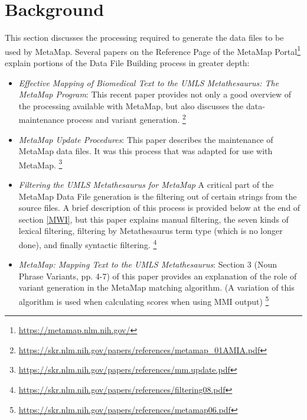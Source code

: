 \documentclass[letterpaper,article]{memoir}
\begin{document}

\chapter{Background}\label{Background}

This section discusses the processing required
to generate the data files to be used by MetaMap.
Several papers on the Reference Page of the
MetaMap Portal\footnote{\url{https://metamap.nlm.nih.gov/}}
explain portions of the Data File Building process
in greater depth:

\begin{itemize}
\item {\em Effective Mapping of Biomedical Text to the UMLS Metathesaurus:
	The MetaMap Program\/}:
  	This recent paper provides not only a good overview of the
	processing available with MetaMap,
        but also discusses the data-maintenance process and variant
        generation.
\footnote{\url{https://skr.nlm.nih.gov/papers/references/metamap_01AMIA.pdf}}
\item {\em MetaMap Update Procedures\/}:
	This paper describes the maintenance of MetaMap data files. It was
        this process that was adapted for use with MetaMap.
\footnote{\url{https://skr.nlm.nih.gov/papers/references/mm.update.pdf}}
\item {\em Filtering the UMLS Metathesaurus for MetaMap\/} 
	A critical part of the MetaMap Data File generation is the
        filtering out of certain strings from the source files.
	A brief description of this process
        is provided below at the end of section \ref{MWI},
        but this paper explains manual filtering,
        the seven kinds of lexical filtering,
        filtering by Metathesaurus term type (which is no longer done),
        and finally syntactic filtering.
\footnote{\url{https://skr.nlm.nih.gov/papers/references/filtering08.pdf}}
\item {\em MetaMap: Mapping Text to the UMLS Metathesaurus\/}:
	Section 3 (Noun Phrase Variants, pp. 4-7) of this paper
        provides an explanation of the role of variant generation
        in the MetaMap matching algorithm. (A variation of this algorithm
        is used when calculating scores when using MMI output)
\footnote{\url{https://skr.nlm.nih.gov/papers/references/metamap06.pdf}}
\end{itemize}
\end{document}
